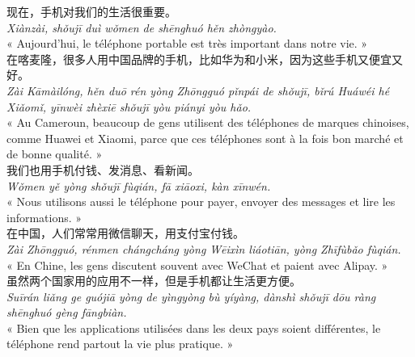 \documentclass[11pt]{article}
\begin{document}
\begin{textebox}
现在，手机对我们的生活很重要。\\
\emph{Xiànzài, shǒujī duì wǒmen de shēnghuó hěn zhòngyào.}\\
« Aujourd'hui, le téléphone portable est très important dans notre vie. »\\[4pt]
在喀麦隆，很多人用中国品牌的手机，比如华为和小米，因为这些手机又便宜又好。\\
\emph{Zài Kāmàilóng, hěn duō rén yòng Zhōngguó pǐnpái de shǒujī, bǐrú Huáwéi hé Xiǎomǐ, yīnwèi zhèxiē shǒujī yòu piányi yòu hǎo.}\\
« Au Cameroun, beaucoup de gens utilisent des téléphones de marques chinoises, comme Huawei et Xiaomi, parce que ces téléphones sont à la fois bon marché et de bonne qualité. »\\[4pt]
我们也用手机付钱、发消息、看新闻。\\
\emph{Wǒmen yě yòng shǒujī fùqián, fā xiāoxi, kàn xīnwén.}\\
« Nous utilisons aussi le téléphone pour payer, envoyer des messages et lire les informations. »\\[4pt]
在中国，人们常常用微信聊天，用支付宝付钱。\\
\emph{Zài Zhōngguó, rénmen chángcháng yòng Wēixìn liáotiān, yòng Zhīfùbǎo fùqián.}\\
« En Chine, les gens discutent souvent avec WeChat et paient avec Alipay. »\\[4pt]
虽然两个国家用的应用不一样，但是手机都让生活更方便。\\
\emph{Suīrán liǎng ge guójiā yòng de yìngyòng bù yíyàng, dànshì shǒujī dōu ràng shēnghuó gèng fāngbiàn.}\\
« Bien que les applications utilisées dans les deux pays soient différentes, le téléphone rend partout la vie plus pratique. »
\end{textebox}
\end{document}
